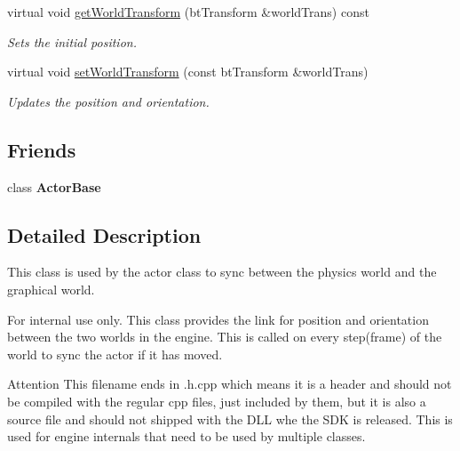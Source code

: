 \begin{DoxyCompactItemize}
virtual void \hyperlink{classphys_1_1internal_1_1PhysMotionState_a8daeae588d49f07da6c6dfec83de45c3}{getWorldTransform} (btTransform \&worldTrans) const 
\begin{DoxyCompactList}\small\item\em Sets the initial position. \item\end{DoxyCompactList}\item 
virtual void \hyperlink{classphys_1_1internal_1_1PhysMotionState_a1fe29e3e661cdbbfb846fbd0ac91ec37}{setWorldTransform} (const btTransform \&worldTrans)
\begin{DoxyCompactList}\small\item\em Updates the position and orientation. \item\end{DoxyCompactList}\end{DoxyCompactItemize}
\subsection*{Friends}
\begin{DoxyCompactItemize}
\item 
\hypertarget{classphys_1_1internal_1_1PhysMotionState_ac09063d4b0192680ba3aa0bd4003a274}{
class {\bfseries ActorBase}}
\label{dc/df8/classphys_1_1internal_1_1PhysMotionState_ac09063d4b0192680ba3aa0bd4003a274}

\end{DoxyCompactItemize}


\subsection{Detailed Description}
This class is used by the actor class to sync between the physics world and the graphical world. \begin{DoxyInternal}{For internal use only.}
This class provides the link for position and orientation between the two worlds in the engine. This is called on every step(frame) of the world to sync the actor if it has moved. \begin{DoxyAttention}{Attention}
This filename ends in .h.cpp which means it is a header and should not be compiled with the regular cpp files, just included by them, but it is also a source file and should not shipped with the DLL whe the SDK is released. This is used for engine internals that need to be used by multiple classes. 
\end{DoxyAttention}
\end{DoxyInternal}


